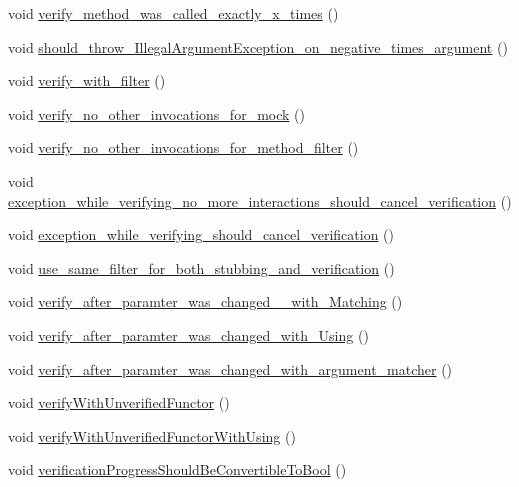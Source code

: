 \begin{DoxyCompactItemize}
\item 
void \mbox{\hyperlink{structBasicVerification_a11db0d315236cd99a35a9eaad2c09933}{verify\+\_\+method\+\_\+was\+\_\+called\+\_\+exactly\+\_\+x\+\_\+times}} ()
\item 
void \mbox{\hyperlink{structBasicVerification_ae1869d0447af0f7298196d0f93459787}{should\+\_\+throw\+\_\+\+Illegal\+Argument\+Exception\+\_\+on\+\_\+negative\+\_\+times\+\_\+argument}} ()
\item 
void \mbox{\hyperlink{structBasicVerification_a77b74a6ffb89211ffb71aeea644161b1}{verify\+\_\+with\+\_\+filter}} ()
\item 
void \mbox{\hyperlink{structBasicVerification_af5cf058563890ec79853884c44fb640c}{verify\+\_\+no\+\_\+other\+\_\+invocations\+\_\+for\+\_\+mock}} ()
\item 
void \mbox{\hyperlink{structBasicVerification_a23272cbf0fd93fd3329fdd18104575ff}{verify\+\_\+no\+\_\+other\+\_\+invocations\+\_\+for\+\_\+method\+\_\+filter}} ()
\item 
void \mbox{\hyperlink{structBasicVerification_ad7cc8f44c3b5f0888deaf4d05aa75678}{exception\+\_\+while\+\_\+verifying\+\_\+no\+\_\+more\+\_\+interactions\+\_\+should\+\_\+cancel\+\_\+verification}} ()
\item 
void \mbox{\hyperlink{structBasicVerification_acd85e50cc39909b1e2415afeaf3050ec}{exception\+\_\+while\+\_\+verifying\+\_\+should\+\_\+cancel\+\_\+verification}} ()
\item 
void \mbox{\hyperlink{structBasicVerification_abd198ebf17e766e5a955f31b35f6b042}{use\+\_\+same\+\_\+filter\+\_\+for\+\_\+both\+\_\+stubbing\+\_\+and\+\_\+verification}} ()
\item 
void \mbox{\hyperlink{structBasicVerification_a73bf0c64a1ccdab9aa653ace6874de38}{verify\+\_\+after\+\_\+paramter\+\_\+was\+\_\+changed\+\_\+\+\_\+with\+\_\+\+Matching}} ()
\item 
void \mbox{\hyperlink{structBasicVerification_abc9d902ee30342b789992b92190085b2}{verify\+\_\+after\+\_\+paramter\+\_\+was\+\_\+changed\+\_\+with\+\_\+\+Using}} ()
\item 
void \mbox{\hyperlink{structBasicVerification_a32486ba1550cf368621136715f4d4f8e}{verify\+\_\+after\+\_\+paramter\+\_\+was\+\_\+changed\+\_\+with\+\_\+argument\+\_\+matcher}} ()
\item 
void \mbox{\hyperlink{structBasicVerification_ab26380b9592a0a75d653f5d0322f8edc}{verify\+With\+Unverified\+Functor}} ()
\item 
void \mbox{\hyperlink{structBasicVerification_af00d59bfab657bcce9db7182190a67f2}{verify\+With\+Unverified\+Functor\+With\+Using}} ()
\item 
void \mbox{\hyperlink{structBasicVerification_a5b169ea0842f3615e89d0d7e00423e46}{verification\+Progress\+Should\+Be\+Convertible\+To\+Bool}} ()
\end{DoxyCompactItemize}
